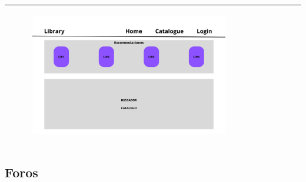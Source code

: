 \documentclass{report}
\begin{document}
\begin{center}
\begin{longtable}{|p{\linewidth}|}
\begin{figure}[H]
                        \includegraphics[width=0.8\textwidth]{./img/grafico/recom_lib.png}
                    \end{figure}\\
                    \hline
                \end{longtable}
            \end{center}
        \clearpage
        \subsection{Foros}
        \clearpage
\end{document}
